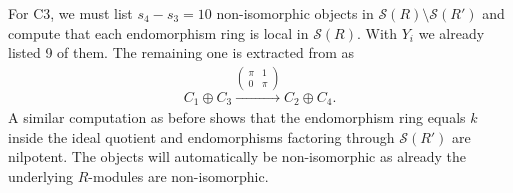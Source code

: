 \documentclass[a4paper]{amsart}
\numberwithin{equation}{section} \theoremstyle{plain}
\numberwithin{thm}{section}
\begin{document}
For C3, we must list $s_4-s_3 = 10$ non-isomorphic objects in $\mathcal{S}(R)\setminus \mathcal{S}(R')$ and compute that each endomorphism ring is local in $\mathcal{S}(R)$. With $Y_i$ we already listed 9 of them. The remaining one is extracted from  as 
\begin{align*}
    C_1 \oplus C_3 \xrightarrow{\left(\begin{smallmatrix}
        \pi & 1 \\
        0 & \pi
    \end{smallmatrix}\right)} C_2 \oplus C_4.
\end{align*}
A similar computation as before shows that the endomorphism ring equals $k$ inside the ideal quotient and endomorphisms factoring through $\mathcal{S}(R')$ are nilpotent. The objects will automatically be non-isomorphic as already the underlying $R$-modules are non-isomorphic. 
\end{document}
